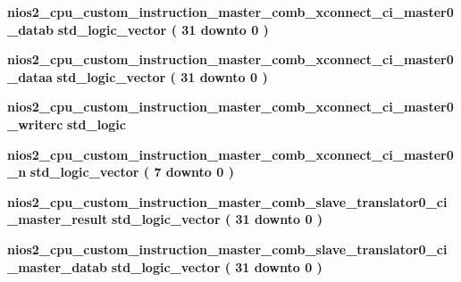 \begin{DoxyCompactItemize}
\item 
{\bf nios2\+\_\+cpu\+\_\+custom\+\_\+instruction\+\_\+master\+\_\+comb\+\_\+xconnect\+\_\+ci\+\_\+master0\+\_\+datab} {\bfseries \textcolor{comment}{std\+\_\+logic\+\_\+vector}\textcolor{vhdlchar}{ }\textcolor{vhdlchar}{(}\textcolor{vhdlchar}{ }\textcolor{vhdlchar}{ } \textcolor{vhdldigit}{31} \textcolor{vhdlchar}{ }\textcolor{keywordflow}{downto}\textcolor{vhdlchar}{ }\textcolor{vhdlchar}{ } \textcolor{vhdldigit}{0} \textcolor{vhdlchar}{ }\textcolor{vhdlchar}{)}\textcolor{vhdlchar}{ }} 
\item 
{\bf nios2\+\_\+cpu\+\_\+custom\+\_\+instruction\+\_\+master\+\_\+comb\+\_\+xconnect\+\_\+ci\+\_\+master0\+\_\+dataa} {\bfseries \textcolor{comment}{std\+\_\+logic\+\_\+vector}\textcolor{vhdlchar}{ }\textcolor{vhdlchar}{(}\textcolor{vhdlchar}{ }\textcolor{vhdlchar}{ } \textcolor{vhdldigit}{31} \textcolor{vhdlchar}{ }\textcolor{keywordflow}{downto}\textcolor{vhdlchar}{ }\textcolor{vhdlchar}{ } \textcolor{vhdldigit}{0} \textcolor{vhdlchar}{ }\textcolor{vhdlchar}{)}\textcolor{vhdlchar}{ }} 
\item 
{\bf nios2\+\_\+cpu\+\_\+custom\+\_\+instruction\+\_\+master\+\_\+comb\+\_\+xconnect\+\_\+ci\+\_\+master0\+\_\+writerc} {\bfseries \textcolor{comment}{std\+\_\+logic}\textcolor{vhdlchar}{ }} 
\item 
{\bf nios2\+\_\+cpu\+\_\+custom\+\_\+instruction\+\_\+master\+\_\+comb\+\_\+xconnect\+\_\+ci\+\_\+master0\+\_\+n} {\bfseries \textcolor{comment}{std\+\_\+logic\+\_\+vector}\textcolor{vhdlchar}{ }\textcolor{vhdlchar}{(}\textcolor{vhdlchar}{ }\textcolor{vhdlchar}{ } \textcolor{vhdldigit}{7} \textcolor{vhdlchar}{ }\textcolor{keywordflow}{downto}\textcolor{vhdlchar}{ }\textcolor{vhdlchar}{ } \textcolor{vhdldigit}{0} \textcolor{vhdlchar}{ }\textcolor{vhdlchar}{)}\textcolor{vhdlchar}{ }} 
\item 
{\bf nios2\+\_\+cpu\+\_\+custom\+\_\+instruction\+\_\+master\+\_\+comb\+\_\+slave\+\_\+translator0\+\_\+ci\+\_\+master\+\_\+result} {\bfseries \textcolor{comment}{std\+\_\+logic\+\_\+vector}\textcolor{vhdlchar}{ }\textcolor{vhdlchar}{(}\textcolor{vhdlchar}{ }\textcolor{vhdlchar}{ } \textcolor{vhdldigit}{31} \textcolor{vhdlchar}{ }\textcolor{keywordflow}{downto}\textcolor{vhdlchar}{ }\textcolor{vhdlchar}{ } \textcolor{vhdldigit}{0} \textcolor{vhdlchar}{ }\textcolor{vhdlchar}{)}\textcolor{vhdlchar}{ }} 
\item 
{\bf nios2\+\_\+cpu\+\_\+custom\+\_\+instruction\+\_\+master\+\_\+comb\+\_\+slave\+\_\+translator0\+\_\+ci\+\_\+master\+\_\+datab} {\bfseries \textcolor{comment}{std\+\_\+logic\+\_\+vector}\textcolor{vhdlchar}{ }\textcolor{vhdlchar}{(}\textcolor{vhdlchar}{ }\textcolor{vhdlchar}{ } \textcolor{vhdldigit}{31} \textcolor{vhdlchar}{ }\textcolor{keywordflow}{downto}\textcolor{vhdlchar}{ }\textcolor{vhdlchar}{ } \textcolor{vhdldigit}{0} \textcolor{vhdlchar}{ }\textcolor{vhdlchar}{)}\textcolor{vhdlchar}{ }} 

\end{DoxyCompactItemize}
